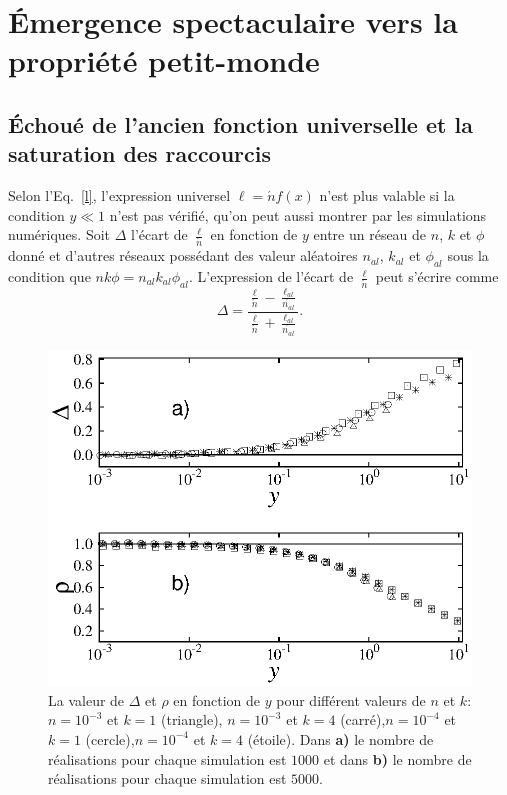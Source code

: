 \section{Émergence spectaculaire vers la propriété petit-monde}
\subsection{Échoué de l'ancien fonction universelle et la saturation des raccourcis}
Selon l'Eq.~\ref{l}, l'expression universel $\ell=\acute{n}f(x)$
n'est plus valable si la condition $y\ll 1$ n'est pas vérifié, qu'on peut aussi montrer par les simulations numériques. Soit $\Delta$ l'écart de $\frac{\ell}{\acute{n}}$ en fonction
de $y$ entre un réseau de $n$, $k$ et $\phi$ donné et d'autres réseaux possédant des valeur aléatoires $n_{al}$, $k_{al}$ 
et $\phi_{al}$ sous la condition que $nk\phi=n_{al}k_{al}\phi_{al}$. L'expression de l'écart de $\frac{\ell}{\acute{n}}$  peut s'écrire  comme
\begin{equation}
\Delta=\frac{\frac{\ell}{\acute{n}}-\frac{\ell_{al}}{\acute{n_{al}}}}{\frac{\ell}{\acute{n}}+\frac{\ell_{al}}{\acute{n_{al}}}}.
\end{equation}

\begin{figure}[h!]
	\centering
	\includegraphics[scale=0.95,angle=0]{./figures/fig3-4}
	\caption{La valeur de $\Delta$ et $\rho$ en fonction de $y$ pour différent valeurs de $n$ et $k$:$n=10^{-3}$ et $k=1$ (triangle), $n=10^{-3}$ et	$k=4$ (carré),$n=10^{-4}$ et $k=1$ (cercle),$n=10^{-4}$ et $k=4$ (étoile). Dans   \textbf{a)} le nombre de réalisations pour chaque simulation est $1000$ et dans \textbf{b)} le nombre de réalisations pour chaque simulation est $5000$.}
	\label{def}
\end{figure}

